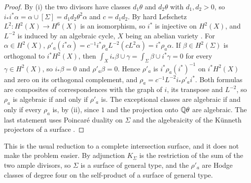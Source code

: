 \begin{proof}
By (i) the two divisors have classes $d_{1}\theta$
and $d_{2}\theta$ with $d_{1},d_{2}>0$, so $i_{*}i^{*}\alpha=\alpha\cup
[\Sigma]=d_{1}d_{2}\theta^{2}\alpha$ and $c=d_{1}d_{2}$. By hard Lefschetz
$L^{2}\colon H^{2}(X)\to H^{6}(X)$ is an isomorphism, so $i^{*}$ is injective
on $H^{2}(X)$, and $L^{-2}$ is induced by an algebraic cycle, $X$ being an
abelian variety \cite[\S2]{Kle68}. For $\alpha\in H^{2}(X)$,
$\rho'_{a}(i^{*}\alpha)=c^{-1}i^{*}\rho_{a}L^{-2}(cL^{2}\alpha)=
i^{*}\rho_{a}\alpha$. If $\beta\in H^{2}(\Sigma)$ is orthogonal to
$i^{*}H^{2}(X)$, then $\int_{X}i_{*}\beta\cup\gamma=\int_{\Sigma}\beta\cup
i^{*}\gamma=0$ for every $\gamma\in H^{2}(X)$, so $i_{*}\beta=0$ and
$\rho'_{a}\beta=0$. Hence $\rho'_{a}$ is $i^{*}\rho_{a}(i^{*})^{-1}$ on
$i^{*}H^{2}(X)$ and zero on its orthogonal complement, and
$\rho_{a}=c^{-1}L^{-2}i_{*}\rho'_{a}i^{*}$. Both formulas are composites of
correspondences with the graph of $i$, its transpose and $L^{-2}$, so
$\rho_{a}$ is algebraic if and only if $\rho'_{a}$ is. The exceptional classes
are algebraic if and only if every $\rho_{a}$ is, by
(ii), since $1$ and the projection onto $\mathbb{Q}\theta$ are
algebraic. The last statement uses Poincar\'e duality on $\Sigma$ and the
algebraicity of the K\"unneth projectors of a surface \cite{Mur90}.
\end{proof}

This is the usual reduction to a complete intersection surface, and it does
not make the problem easier. By adjunction $K_{\Sigma}$ is the restriction of
the sum of the two ample divisors, so $\Sigma$ is a surface of general type,
and the $\rho'_{a}$ are Hodge classes of degree four on the self-product of
a surface of general type.

